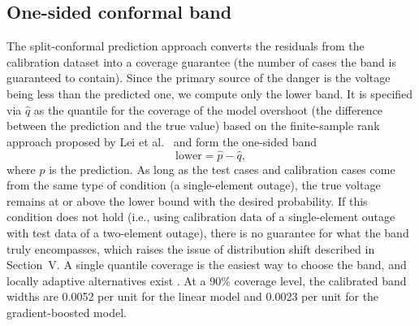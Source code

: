 \documentclass[conference]{IEEEtran}
\begin{document}
\subsection{One-sided conformal band}
The split-conformal prediction approach converts the residuals from the calibration dataset into a coverage guarantee (the number of cases the band is guaranteed to contain)\cite{lei2018,vovk2005}. Since the primary source of the danger is the voltage being less than the predicted one, we compute only the lower band. It is specified via $\hat{q}$ as the quantile for the coverage of the model overshoot (the difference between the prediction and the true value) based on the finite-sample rank approach proposed by Lei et al.\ \cite{lei2018} and form the one-sided band
\begin{equation}
\text{lower} = \hat{p} - \hat{q},
\end{equation}
where $\hat{p}$ is the prediction. As long as the test cases and calibration cases come from the same type of condition (a single-element outage), the true voltage remains at or above the lower bound with the desired probability. If this condition does not hold (i.e., using calibration data of a single-element outage with test data of a two-element outage), there is no guarantee for what the band truly encompasses, which raises the issue of distribution shift described in Section~V. A single quantile coverage is the easiest way to choose the band, and locally adaptive alternatives exist \cite{romano2019}. At a 90\% coverage level, the calibrated band widths are 0.0052 per unit for the linear model and 0.0023 per unit for the gradient-boosted model.
\end{document}
